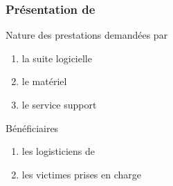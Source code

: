  \begin{frame}
 \frametitle {Présentation de \mo}
 \begin{block}{Nature des prestations demandées par \mo}
  
 \begin{enumerate}
 \item la suite logicielle 
 \item le matériel 
 \item le service support
 \end{enumerate}
 \end{block}
 \pause 
 \begin{block}{Bénéficiaires}
 \begin{enumerate}
 \item les logisticiens de \mo
 \item les victimes prises en charge
 \end{enumerate}
 \end{block}
 \end{frame}
 
